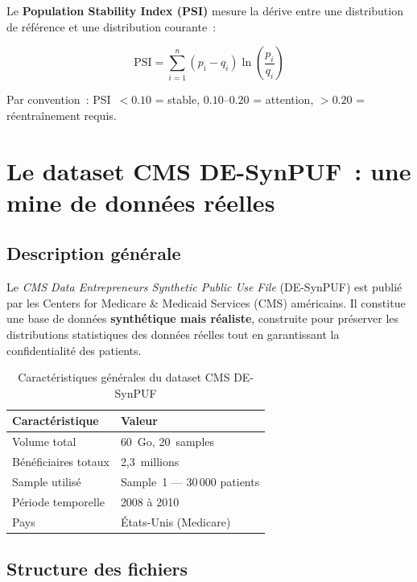 Le \textbf{Population Stability Index (PSI)} mesure la dérive entre une
distribution de référence et une distribution courante~:

\begin{equation}
\label{eq:psi}
\text{PSI} = \sum_{i=1}^{n} \left( p_i - q_i \right)
             \ln\!\left(\frac{p_i}{q_i}\right)
\end{equation}

\noindent Par convention~: PSI~$< 0.10$ = stable, $0.10$--$0.20$ = attention,
$> 0.20$ = réentraînement requis.

\section{Le dataset CMS DE-SynPUF~: une mine de données réelles}

\subsection{Description générale}

Le \textit{CMS Data Entrepreneurs Synthetic Public Use File} (DE-SynPUF) est
publié par les Centers for Medicare \& Medicaid Services (CMS) américains. Il
constitue une base de données \textbf{synthétique mais réaliste}, construite
pour préserver les distributions statistiques des données réelles tout en
garantissant la confidentialité des patients.

\begin{table}[htbp]
\centering
\caption{Caractéristiques générales du dataset CMS DE-SynPUF}
\label{tab:dataset}
\begin{tabular}{@{}ll@{}}
\toprule
\textbf{Caractéristique} & \textbf{Valeur} \\
\midrule
Volume total         & 60~Go, 20~samples \\
Bénéficiaires totaux & 2,3~millions \\
Sample utilisé       & Sample~1 --- 30\,000 patients \\
Période temporelle   & 2008 à 2010 \\
Pays                 & États-Unis (Medicare) \\
\bottomrule
\end{tabular}
\end{table}

\subsection{Structure des fichiers}

